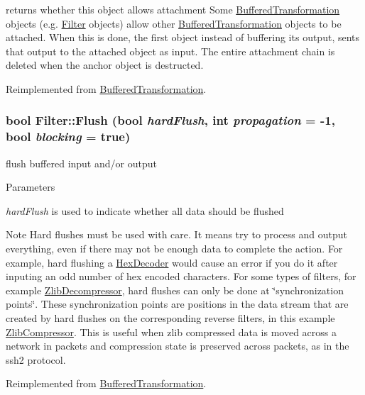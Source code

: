 returns whether this object allows attachment Some \hyperlink{class_buffered_transformation}{BufferedTransformation} objects (e.g. \hyperlink{class_filter}{Filter} objects) allow other \hyperlink{class_buffered_transformation}{BufferedTransformation} objects to be attached. When this is done, the first object instead of buffering its output, sents that output to the attached object as input. The entire attachment chain is deleted when the anchor object is destructed. 

Reimplemented from \hyperlink{class_buffered_transformation_a20112606fc006c56f1561653cabd9542}{BufferedTransformation}.\hypertarget{class_filter_ad845deb5113d2bd04d109c05abfd3098}{
\subsubsection[{Flush}]{\setlength{\rightskip}{0pt plus 5cm}bool Filter::Flush (bool {\em hardFlush}, \/  int {\em propagation} = {\ttfamily -\/1}, \/  bool {\em blocking} = {\ttfamily true})}}
\label{class_filter_ad845deb5113d2bd04d109c05abfd3098}


flush buffered input and/or output 
\begin{DoxyParams}{Parameters}
\item[{\em hardFlush}]is used to indicate whether all data should be flushed \end{DoxyParams}
\begin{DoxyNote}{Note}
Hard flushes must be used with care. It means try to process and output everything, even if there may not be enough data to complete the action. For example, hard flushing a \hyperlink{class_hex_decoder}{HexDecoder} would cause an error if you do it after inputing an odd number of hex encoded characters. For some types of filters, for example \hyperlink{class_zlib_decompressor}{ZlibDecompressor}, hard flushes can only be done at \char`\"{}synchronization points\char`\"{}. These synchronization points are positions in the data stream that are created by hard flushes on the corresponding reverse filters, in this example \hyperlink{class_zlib_compressor}{ZlibCompressor}. This is useful when zlib compressed data is moved across a network in packets and compression state is preserved across packets, as in the ssh2 protocol. 
\end{DoxyNote}


Reimplemented from \hyperlink{class_buffered_transformation_ac6c7f9508d50155d9e75c295b8bc5743}{BufferedTransformation}.

